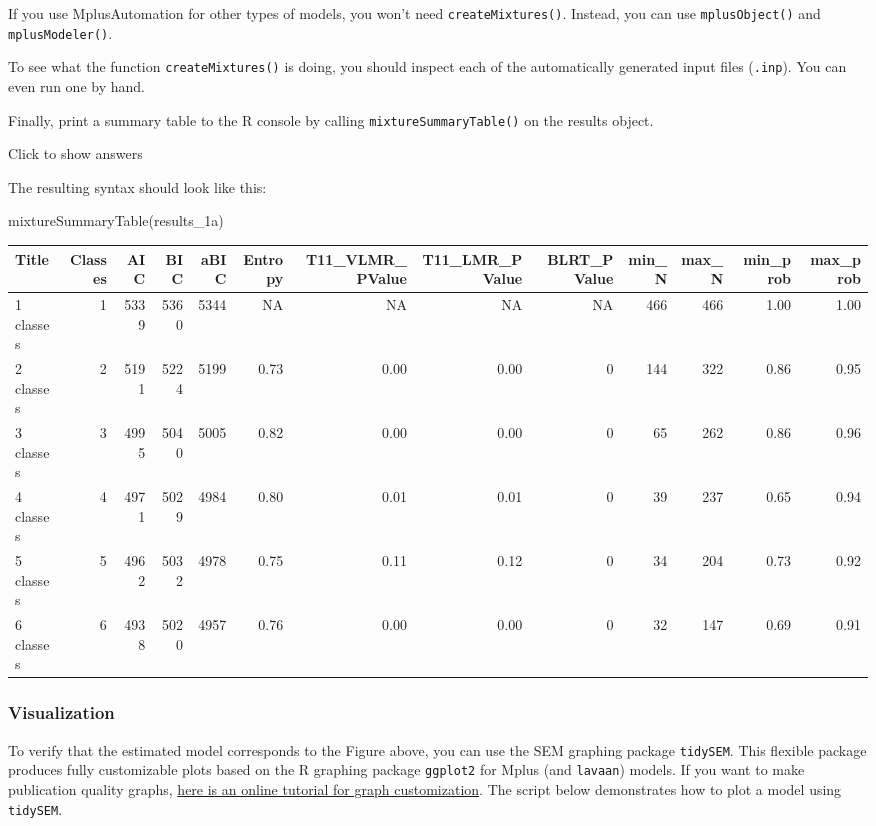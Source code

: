 \documentclass[
]{book}
\newenvironment{Shaded}{\begin{snugshade}}{\end{snugshade}}
\newcommand{\FunctionTok}[1]{\textcolor[rgb]{0.00,0.00,0.00}{#1}}
\newcommand{\NormalTok}[1]{#1}
\begin{document}
If you use MplusAutomation for other types of models, you won't need \texttt{createMixtures()}. Instead, you can use \texttt{mplusObject()} and \texttt{mplusModeler()}.

To see what the function \texttt{createMixtures()} is doing, you should inspect each of the automatically generated input files (\texttt{.inp}). You can even run one by hand.

Finally, print a summary table to the R console by calling \texttt{mixtureSummaryTable()} on the results object.

Click to show answers

The resulting syntax should look like this:

\begin{Shaded}
\begin{Highlighting}[]
\FunctionTok{mixtureSummaryTable}\NormalTok{(results\_1a)}
\end{Highlighting}
\end{Shaded}

\begin{tabular}[t]{l|r|r|r|r|r|r|r|r|r|r|r|r}
\hline
Title & Classes & AIC & BIC & aBIC & Entropy & T11\_VLMR\_PValue & T11\_LMR\_PValue & BLRT\_PValue & min\_N & max\_N & min\_prob & max\_prob\\
\hline
1 classes & 1 & 5339 & 5360 & 5344 & NA & NA & NA & NA & 466 & 466 & 1.00 & 1.00\\
\hline
2 classes & 2 & 5191 & 5224 & 5199 & 0.73 & 0.00 & 0.00 & 0 & 144 & 322 & 0.86 & 0.95\\
\hline
3 classes & 3 & 4995 & 5040 & 5005 & 0.82 & 0.00 & 0.00 & 0 & 65 & 262 & 0.86 & 0.96\\
\hline
4 classes & 4 & 4971 & 5029 & 4984 & 0.80 & 0.01 & 0.01 & 0 & 39 & 237 & 0.65 & 0.94\\
\hline
5 classes & 5 & 4962 & 5032 & 4978 & 0.75 & 0.11 & 0.12 & 0 & 34 & 204 & 0.73 & 0.92\\
\hline
6 classes & 6 & 4938 & 5020 & 4957 & 0.76 & 0.00 & 0.00 & 0 & 32 & 147 & 0.69 & 0.91\\
\hline
\end{tabular}

\hypertarget{visualization-1}{%
\subsubsection{Visualization}\label{visualization-1}}

To verify that the estimated model corresponds to the Figure above, you can use the SEM graphing package \texttt{tidySEM}.
This flexible package produces fully customizable plots based on the R graphing package \texttt{ggplot2} for Mplus (and \texttt{lavaan}) models.
If you want to make publication quality graphs, \href{https://cjvanlissa.github.io/tidySEM/articles/Plotting_graphs.html}{here is an online tutorial for graph customization}.
The script below demonstrates how to plot a model using \texttt{tidySEM}.
\end{document}
